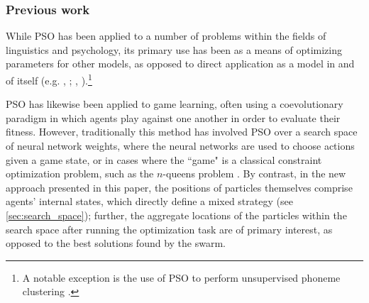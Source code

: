 \documentclass[11pt]{article}
\begin{document}
\subsubsection{Previous work}
\label{sec:pso_prev_work}

While PSO has been applied to a number of problems within the fields of linguistics and psychology, its primary use has been as a means of optimizing parameters for other models, as opposed to direct application as a model in and of itself (e.g. \citeauthor{chatterjee2005}, \citeyear{chatterjee2005}; \citeauthor{mehdad2009}, \citeyear{mehdad2009}).\footnote{A notable exception is the use of PSO to perform unsupervised phoneme clustering \citep{ahmadi2007}.}

PSO has likewise been applied to game learning, often using a coevolutionary paradigm in which agents play against one another in order to evaluate their fitness. However, traditionally this method has involved PSO over a search space of neural network weights, where the neural networks are used to choose actions given a game state, or in cases where the ``game" is a classical constraint optimization problem, such as the $n$-queens problem \citep{engelbrecht2005}. By contrast, in the new approach presented in this paper, the positions of particles themselves comprise agents' internal states, which directly define a mixed strategy (see \ref{sec:search_space}); further, the aggregate locations of the particles within the search space after running the optimization task are of primary interest, as opposed to the best solutions found by the swarm.
\end{document}
